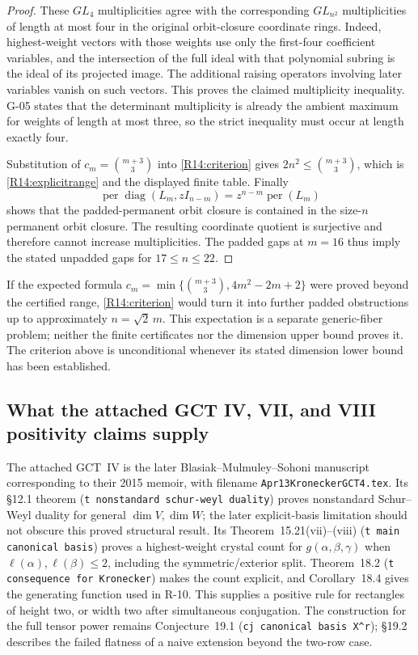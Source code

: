 \begin{proof}
These $GL_4$ multiplicities agree with the corresponding
$GL_{n^2}$ multiplicities of length at most four in the original
orbit-closure coordinate rings. Indeed, highest-weight vectors
with those weights use only the first-four coefficient variables,
and the intersection of the full ideal with that polynomial
subring is the ideal of its projected image. The additional
raising operators involving later variables vanish on such
vectors. This proves the claimed multiplicity inequality.
G-05 states that the determinant multiplicity is already the
ambient maximum for weights of length at most three, so the
strict inequality must occur at length exactly four.

Substitution of $c_m=\binom{m+3}{3}$ into
\eqref{R14:criterion} gives $2n^2\leq\binom{m+3}{3}$, which is
\eqref{R14:explicitrange} and the displayed finite table.
Finally
\[
 \operatorname{per}\operatorname{diag}(L_m,zI_{n-m})
 =z^{n-m}\operatorname{per}(L_m)
\]
shows that the padded-permanent orbit closure is contained in
the size-$n$ permanent orbit closure. The resulting coordinate
quotient is surjective and therefore cannot increase
multiplicities. The padded gaps at $m=16$ thus imply the stated
unpadded gaps for $17\leq n\leq22$.
\end{proof}

If the expected formula
$c_m=\min\{\binom{m+3}{3},4m^2-2m+2\}$ were proved beyond the
certified range, \eqref{R14:criterion} would turn it into further
padded obstructions up to approximately $n=\sqrt2\,m$.
This expectation is a separate generic-fiber problem; neither
the finite certificates nor the dimension upper bound proves it.
The criterion above is unconditional whenever its stated
dimension lower bound has been established.

\subsection{What the attached GCT IV, VII, and VIII positivity claims supply}

The attached GCT~IV is the later Blasiak--Mulmuley--Sohoni manuscript
corresponding to their 2015 memoir, with filename
\texttt{Apr13KroneckerGCT4.tex}. Its \S12.1 theorem
(\texttt{t nonstandard schur-weyl duality}) proves nonstandard
Schur--Weyl duality for general $\dim V,\dim W$; the later
explicit-basis limitation should not obscure this proved
structural result. Its Theorem~15.21(vii)--(viii)
(\texttt{t main canonical basis}) proves a highest-weight crystal
count for $g(\alpha,\beta,\gamma)$ when
$\ell(\alpha),\ell(\beta)\leq2$, including the symmetric/exterior
split. Theorem~18.2 (\texttt{t consequence for Kronecker}) makes
the count explicit, and Corollary~18.4 gives the generating
function used in R-10. This supplies a positive rule for rectangles
of height two, or width two after simultaneous conjugation.
The construction for the full tensor power remains Conjecture~19.1
(\texttt{cj canonical basis X\^{}r}); \S19.2 describes the failed
flatness of a naive extension beyond the two-row case.

